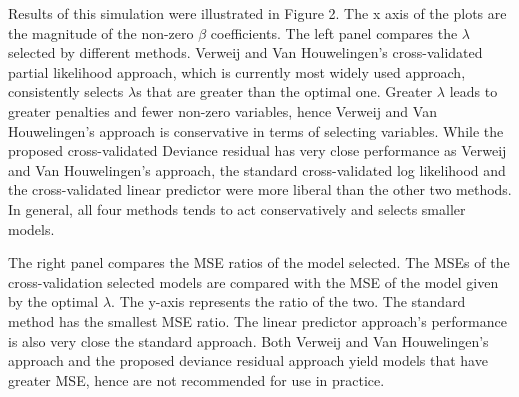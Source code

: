 \par Results of this simulation were illustrated in Figure 2.  The x axis of the plots are the magnitude of the non-zero $\beta$ coefficients. The left panel compares the $\lambda$ selected by different methods. Verweij and Van Houwelingen's cross-validated partial likelihood approach, which is currently most widely used approach, consistently selects $\lambda$s that are greater than the optimal one.  Greater $\lambda$ leads to greater penalties and fewer non-zero variables, hence Verweij and Van Houwelingen's approach is conservative in terms of selecting variables. While the proposed cross-validated Deviance residual has very close performance as Verweij and Van Houwelingen's approach, the standard cross-validated log likelihood and the cross-validated linear predictor were more liberal than the other two methods. In general, all four methods tends to act conservatively and selects smaller models. 

\par The right panel compares the MSE ratios of the model selected. The MSEs of the cross-validation selected models are compared with the MSE of the model given by the optimal $\lambda$. The y-axis represents the ratio of the two. The standard method has the smallest MSE ratio. The linear predictor approach's performance is also very close the standard approach. Both Verweij and Van Houwelingen's approach and the proposed deviance residual approach yield models that have greater MSE, hence are not recommended for use in practice.
 
